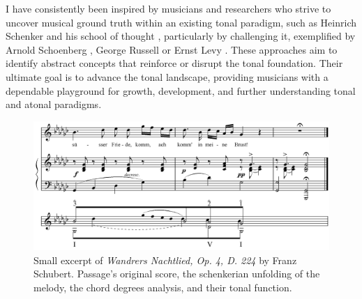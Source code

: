 I have consistently been inspired by musicians and researchers who strive to uncover musical ground truth within an existing tonal paradigm, such as Heinrich Schenker and his school of thought \cite{Komar1959SchenkersStructure}, particularly by challenging it, exemplified by Arnold Schoenberg \cite{Samson1974SchoenbergsMusic}, George Russell \cite{LydianRussell} or Ernst Levy \cite{LevyAHarmony}. These approaches aim to identify abstract concepts that reinforce or disrupt the tonal foundation. Their ultimate goal is to advance the tonal landscape, providing musicians with a dependable playground for growth, development, and further understanding tonal and atonal paradigms.


\begin{figure}[ht]
\includegraphics[clip,width=\columnwidth]{figures/schenkerian analysis/SchubertOp4no3.png}%
\caption[Excerpt of \textit{Wandrers Nachtlied, Op. 4, D. 224} by Franz Schubert.]{\small{Small excerpt of \textit{Wandrers Nachtlied, Op. 4, D. 224} by Franz Schubert. Passage's original score, the schenkerian unfolding of the melody, the chord degrees analysis, and their tonal function.}}
\label{fig:Wandrers Nachtlied, Op. 4, D. 224}
\end{figure}